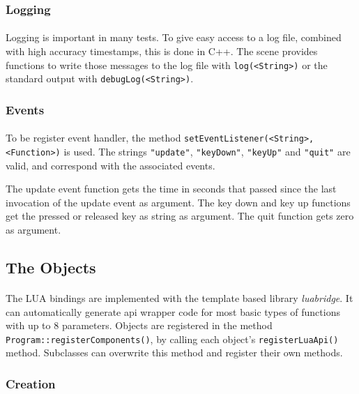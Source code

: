 \subsubsection{Logging}
\paragraph{}
Logging is important in many tests. To give easy access to a log file, combined with high accuracy timestamps, this is done in C++.
The scene provides functions to write those messages to the log file with \texttt{log(<String>)} or the standard output with \texttt{debugLog(<String>)}.

\subsubsection{Events}
\paragraph{}
To be register event handler, the method \texttt{setEventListener(<String>, <Function>)} is used.
The strings \texttt{"update"}, \texttt{"keyDown"}, \texttt{"keyUp"} and \texttt{"quit"} are valid, and correspond with the associated events.

The update event function gets the time in seconds that passed since the last invocation of the update event as argument.
The key down and key up functions get the pressed or released key as string as argument.
The quit function gets zero as argument.

\subsection{The Objects}
\paragraph{}
The LUA bindings are implemented with the template based library \textit{luabridge}\cite{lb}.
It can automatically generate api wrapper code for most basic types of functions with up to 8 parameters.
Objects are registered in the method \texttt{Program::registerComponents()},
by calling each object's \texttt{registerLuaApi()} method.
Subclasses can overwrite this method and register their own methods.

\subsubsection{Creation}
